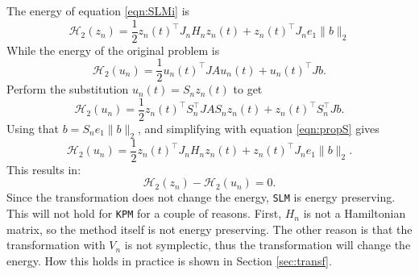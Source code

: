 \noindent The energy of equation \eqref{eqn:SLMi} is
\begin{equation*}
\mathcal{H}_2(z_n) = \frac{1}{2}z_n(t)^\top J_n H_n z_n(t) + z_n(t)^\top J_n e_1 \|b \|_2
\end{equation*}
\noindent While the energy of the original problem is 
\begin{equation*}
\mathcal{H}_2(u_n) = \frac{1}{2}u_n(t)^\top J A u_n(t) + u_n(t)^\top J b.
\end{equation*}
Perform the substitution $ u_n(t) = S_n z_n(t) $ to get
\begin{equation*}
\mathcal{H}_2(u_n) = \frac{1}{2}z_n(t)^\top S_n^\top J A S_n z_n(t) + z_n(t)^\top S_n^\top J b.
\end{equation*}
Using that $ b = S_n e_1 \| b \|_2 $, and simplifying with equation \eqref{eqn:propS} gives 
\begin{equation*}
\mathcal{H}_2(u_n) = \frac{1}{2}z_n(t)^\top J_n H_n z_n(t) + z_n(t)^\top J_n e_1 \|b \|_2.
\end{equation*}
This results in: 
\begin{equation*}
\mathcal{H}_2(z_n) - \mathcal{H}_2(u_n) = 0.
\end{equation*}
Since the transformation does not change the energy, \texttt{SLM} is energy preserving. This will not hold for \texttt{KPM} for a couple of reasons. First, $H_n$ is not a Hamiltonian matrix, so the method itself is not energy preserving. The other reason is that the transformation with $V_n$ is not symplectic, thus the transformation will change the energy. How this holds in practice is shown in Section \ref{sec:transf}.\\ 

